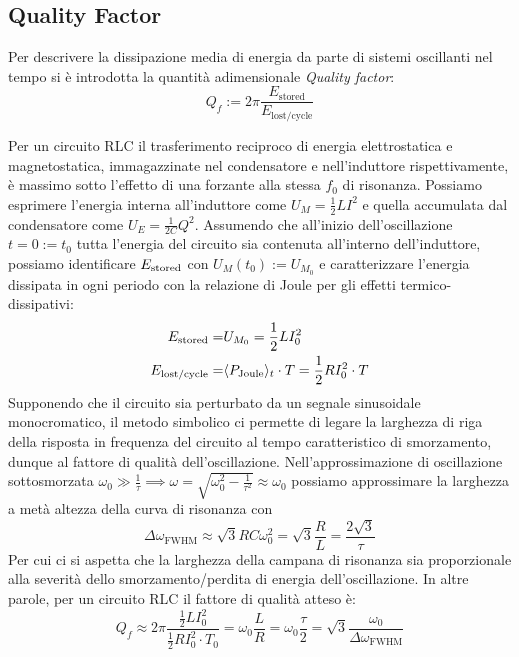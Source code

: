 \documentclass{article}[a4paper, oneside, 11pt]
\begin{document}
\subsection{Quality Factor}
Per descrivere la dissipazione media di energia da parte di sistemi oscillanti
nel tempo si è introdotta la quantità adimensionale \emph{Quality factor}:
\begin{equation}\label{eq: Qf}
	Q_f := 2\pi \frac{E_{\text{stored}}}{E_{\text{lost/cycle}}}
\end{equation}

Per un circuito RLC il trasferimento reciproco di energia elettrostatica e
magnetostatica, immagazzinate nel condensatore e nell'induttore rispettivamente,
è massimo sotto l'effetto di una forzante alla stessa $f_0$ di risonanza.
Possiamo esprimere l'energia interna all'induttore come $U_M = \frac{1}{2}LI^2$
e quella accumulata dal condensatore come $U_E = \frac{1}{2C}Q^2$.
Assumendo che all'inizio dell'oscillazione $t = 0 := t_0$ tutta l'energia del
circuito sia contenuta all'interno dell'induttore, possiamo identificare
$E_{\rm stored}$ con $U_M(t_0) := U_{M_0}$ e caratterizzare l'energia dissipata
in ogni periodo con la relazione di Joule per gli effetti termico-dissipativi:
\begin{align}
	E_{\text{stored}} =& U_{M_0} = \frac{1}{2} LI_0^2 \\
	E_{\text{lost/cycle}} =& \langle P_{\rm Joule} \rangle_t \cdot T = 
	\frac{1}{2} RI_0^2 \cdot T
\end{align}
Supponendo che il circuito sia perturbato da un segnale sinusoidale
monocromatico, il metodo simbolico ci permette di legare la larghezza di riga
della risposta in frequenza del circuito al tempo caratteristico di
smorzamento, dunque al fattore di qualità dell'oscillazione.
Nell'approssimazione di oscillazione sottosmorzata $\omega_0 \gg \frac{1}{\tau}
\implies \omega = \sqrt{\omega_0^2 - \frac{1}{\tau^2}} \approx \omega_0$
possiamo approssimare la larghezza a metà altezza della curva di risonanza con 
\begin{equation}\label{eq: FWHM}
	\Delta \omega_{\text{FWHM}}	\approx \sqrt{3} RC \omega_0^2 = 
	\sqrt{3} \frac{R}{L} = \frac{2 \sqrt{3}}{\tau} 
\end{equation}
Per cui ci si aspetta che la larghezza della campana di risonanza sia
proporzionale alla severità dello smorzamento/perdita di energia
dell'oscillazione.
In altre parole, per un circuito RLC il fattore di qualità atteso è:
\begin{equation}\label{eq: QfFWHM}
	Q_f \approx 2\pi \frac{\frac{1}{2}L I_0^2}{\frac{1}{2}R I_0^2 \cdot T_0}
	= \omega_0 \frac{L}{R} = \omega_0 \frac{\tau}{2} 
	= \sqrt{3} \frac{\omega_0}{\Delta \omega_{\text{FWHM}}} 
\end{equation}
\end{document}

